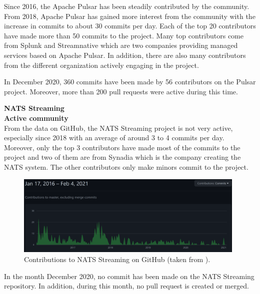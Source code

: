 Since 2016, the Apache Pulsar has been steadily contributed by the community. From 2018, Apache Pulsar has gained more interest from the community with the increase in commits to about 30 commits per day. Each of the top 20 contributors have made more than 50 commits to the project. Many top contributors come from Splunk and Streamnative which are two companies providing managed services based on Apache Pulsar. In addition, there are also many contributors from the different organization actively engaging in the project.

In December 2020, 360 commits have been made by 56 contributors on the Pulsar project. Moreover, more than 200 pull requests were active during this time. 

\large \textbf{NATS Streaming}\\
\normalsize
\textbf{Active community}\\
From the data on GitHub, the NATS Streaming project is not very active, especially since 2018 with an average of around 3 to 4 commits per day. Moreover, only the top 3 contributors have made most of the commits to the project and two of them are from Synadia which is the company creating the NATS system. The other contributors only make minors commit to the project. 

\begin{figure}[h]
	\centering
	\includegraphics[width=11cm]{images/community-nats.png}
	\caption{Contributions to NATS Streaming on GitHub (taken from \cite{natsrepo}).}
	\label{fig:communitynats}
\end{figure}

In the month December 2020, no commit has been made on the NATS Streaming repository. In addition, during this month, no pull request is created or merged. 

